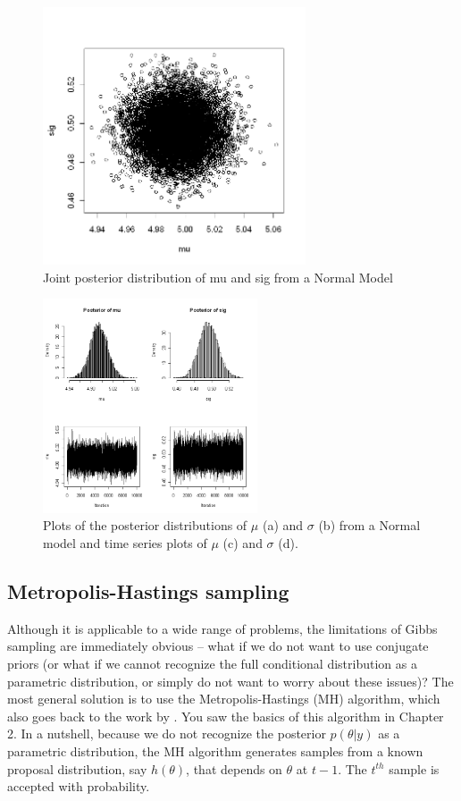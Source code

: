 \begin{figure}
\begin{center}
\includegraphics[height=3in]{Ch7/figs/postdist}
\end{center}
\caption{Joint posterior distribution of mu and sig from a Normal Model}
\label{postdist.fig}
\end{figure}

\begin{figure}
\begin{center}
\includegraphics[width=2.5in]{Ch7/figs/plotsofPD}
\end{center}
\caption{Plots of the posterior distributions of $\mu$ (a) and $\sigma$ (b)
  from a Normal model and time series plots of $\mu$ (c) and $\sigma$ (d).}
\label{plotsofPD.fig}
\end{figure}

\subsection{ Metropolis-Hastings sampling   }

Although it is applicable to a wide range of problems, the limitations
of Gibbs sampling are immediately obvious – what if we do not want to
use conjugate priors (or what if we cannot recognize the full
conditional distribution as a parametric distribution, or simply do
not want to worry about these issues)? The most general solution is to
use the Metropolis-Hastings (MH) algorithm, which also goes back to
the work by \citet{metropolis_ulam:1953}. You saw the basics of this
algorithm in Chapter 2. In a nutshell, because we do not recognize the
posterior $p(\theta|y)$ as a parametric distribution, the MH algorithm
generates samples from a known proposal distribution, say $h(\theta)$,
that depends on $\theta$ at $t-1$. The $t^{th}$ sample is accepted with probability. 

